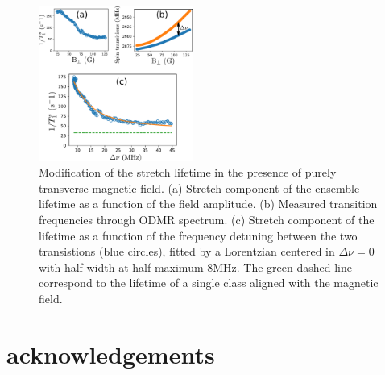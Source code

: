 \documentclass[preprintnumbers,amsmath,amssymb,superscriptaddress,twocolumn,showpacs]{revtex4-1}
\begin{document}
\begin{figure}
\includegraphics[width=0.45\textwidth]{Figures/fig transverse field}
\caption{Modification of the stretch lifetime in the presence of purely transverse magnetic field. (a) Stretch component of the ensemble lifetime as a function of the field amplitude. (b) Measured transition frequencies through ODMR spectrum. (c) Stretch component of the lifetime as a function of the frequency detuning between the two transistions (blue circles), fitted by a Lorentzian centered in $\Delta \nu=0$ with half width at half maximum 8MHz. The green dashed line correspond to the lifetime of a single class aligned with the magnetic field.}
\end{figure}

\section*{acknowledgements}



\end{document}
